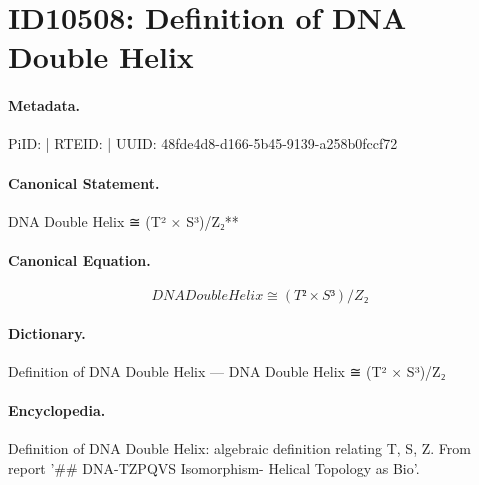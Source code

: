 \section*{ID10508: Definition of DNA Double Helix}
\paragraph{Metadata.}
PiID:  | RTEID:  | UUID: 48fde4d8-d166-5b45-9139-a258b0fccf72

\paragraph{Canonical Statement.}
DNA Double Helix ≅ (T² × S³)/Z₂**

\paragraph{Canonical Equation.}
\[
DNA Double Helix ≅ (T² × S³)/Z₂
\]

\paragraph{Dictionary.}
Definition of DNA Double Helix — DNA Double Helix ≅ (T² × S³)/Z₂

\paragraph{Encyclopedia.}
Definition of DNA Double Helix: algebraic definition relating T, S, Z. From report '\#\# DNA-TZPQVS Isomorphism- Helical Topology as Bio'.
